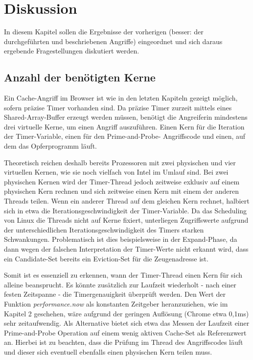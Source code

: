\chapter{Diskussion}
\label{chapter:discussion}

In diesem Kapitel sollen die Ergebnisse der vorherigen (besser: der durchgeführten und beschriebenen Angriffe) eingeordnet und sich daraus ergebende Fragestellungen diskutiert werden.


\section{Anzahl der benötigten Kerne}

Ein Cache-Angriff im Browser ist wie in den letzten Kapiteln gezeigt möglich, sofern präzise Timer vorhanden sind. Da präzise Timer zurzeit mittels eines Shared-Array-Buffer erzeugt werden müssen, benötigt die Angreiferin mindestens drei virtuelle Kerne, um einen Angriff auszuführen. Einen Kern für die Iteration der Timer-Variable, einen für den Prime-and-Probe- Angriffscode und einen, auf dem das Opferprogramm läuft.

Theoretisch reichen deshalb bereits Prozessoren mit zwei physischen und vier virtuellen Kernen, wie sie noch vielfach von Intel im Umlauf sind. Bei zwei physischen Kernen wird der Timer-Thread jedoch zeitweise exklusiv auf einem physischen Kern rechnen und sich zeitweise einen Kern mit einem der anderen Threads teilen.
Wenn ein anderer Thread auf dem gleichen Kern rechnet, halbiert sich in etwa die Iterationsgeschwindigkeit der Timer-Variable.
Da das Scheduling von Linux die Threads nicht auf Kerne fixiert, unterliegen Zugriffswerte aufgrund der unterschiedlichen Iterationsgeschwindigkeit des Timers starken Schwankungen.
Problematisch ist dies beispielsweise in der Expand-Phase, da dann wegen der falschen Interpretation der Timer-Werte nicht erkannt wird, dass ein Candidate-Set bereits ein Eviction-Set für die Zeugenadresse ist.

Somit ist es essenziell zu erkennen, wann der Timer-Thread einen Kern für sich alleine beansprucht.
Es könnte zusätzlich zur Laufzeit wiederholt - nach einer festen Zeitspanne - die Timergenauigkeit überprüft werden.
Den Wert der Funktion \textit{performance.now} als konstanten Zeitgeber heranzuziehen, wie im Kapitel 2 geschehen, wäre aufgrund der geringen Auflösung (Chrome etwa 0,1ms) sehr zeitaufwendig.
Als Alternative bietet sich etwa das Messen der Laufzeit einer Prime-and-Probe Operation auf einem wenig aktiven Cache-Set als Referenzwert an.
Hierbei ist zu beachten, dass die Prüfung im Thread des Angriffscodes läuft und dieser sich eventuell ebenfalls einen physischen Kern teilen muss.

